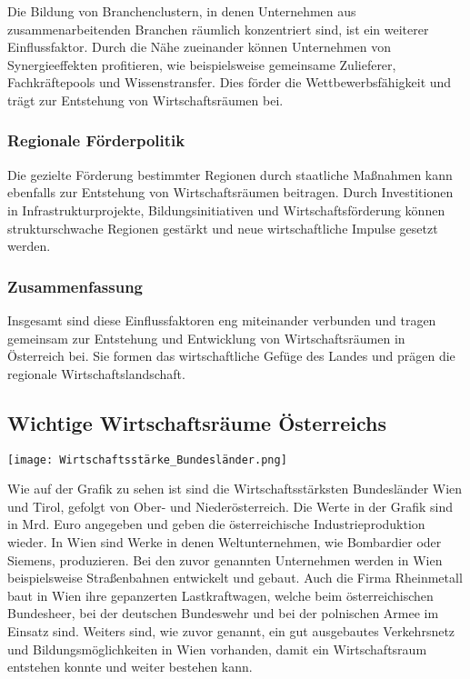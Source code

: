 Die Bildung von Branchenclustern, in denen Unternehmen aus zusammenarbeitenden Branchen räumlich konzentriert sind, ist ein weiterer Einflussfaktor. Durch die Nähe zueinander können Unternehmen von Synergieeffekten profitieren, wie beispielsweise gemeinsame Zulieferer, Fachkräftepools und Wissenstransfer. Dies förder die Wettbewerbsfähigkeit und trägt zur Entstehung von Wirtschaftsräumen bei.

\subsubsection{Regionale Förderpolitik}

Die gezielte Förderung bestimmter Regionen durch staatliche Maßnahmen kann ebenfalls zur Entstehung von Wirtschaftsräumen beitragen. Durch Investitionen in Infrastrukturprojekte, Bildungsinitiativen und Wirtschaftsförderung können strukturschwache Regionen gestärkt und neue wirtschaftliche Impulse gesetzt werden.

\subsubsection{Zusammenfassung}

Insgesamt sind diese Einflussfaktoren eng miteinander verbunden und tragen gemeinsam zur Entstehung und Entwicklung von Wirtschaftsräumen in Österreich bei. Sie formen das wirtschaftliche Gefüge des Landes und prägen die regionale Wirtschaftslandschaft.

\subsection{Wichtige Wirtschaftsräume Österreichs}

\texttt{[image: Wirtschaftsstärke\_Bundesländer.png]}

Wie auf der Grafik zu sehen ist sind die Wirtschaftsstärksten Bundesländer Wien und Tirol, gefolgt von Ober- und Niederösterreich. Die Werte in der Grafik sind in Mrd. Euro angegeben und geben die österreichische Industrieproduktion wieder. In Wien sind Werke in denen Weltunternehmen, wie Bombardier oder Siemens, produzieren. Bei den zuvor genannten Unternehmen werden in Wien beispielsweise Straßenbahnen entwickelt und gebaut. Auch die Firma Rheinmetall baut in Wien ihre gepanzerten Lastkraftwagen, welche beim österreichischen Bundesheer, bei der deutschen Bundeswehr und bei der polnischen Armee im Einsatz sind. Weiters sind, wie zuvor genannt, ein gut ausgebautes Verkehrsnetz und Bildungsmöglichkeiten in Wien vorhanden, damit ein Wirtschaftsraum entstehen konnte und weiter bestehen kann. 

